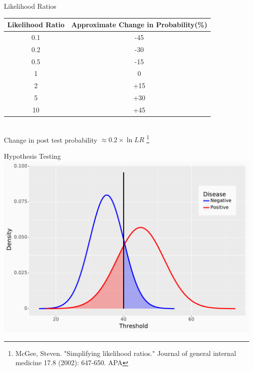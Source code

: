 \documentclass[10pt, xcolor=table]{beamer}
\begin{document}
\begin{frame}{Likelihood Ratios}
	\begin{center}
		\begin{tabular}{c c}
			\rowcolor{gray!50}
			Likelihood Ratio & Approximate Change in Probability(\%) \\ \hline
			0.1 & -45 \\
			0.2 & -30 \\
			0.5 & -15 \\
			1 & 0 \\
			2 & +15 \\
			5 & +30 \\
			10 & +45
		\end{tabular} \\[2em]
		Change in post test probability $\approx 0.2 \times \ln{LR}$ \footnote{{McGee, Steven. "Simplifying likelihood ratios." Journal of general internal medicine 17.8 (2002): 647-650.
APA	
}}
	\end{center}
\end{frame}


\begin{frame}{Hypothesis Testing}
	\includegraphics[height=0.8\textheight]{images/overlap_distr.pdf}
\end{frame}
\end{document}

